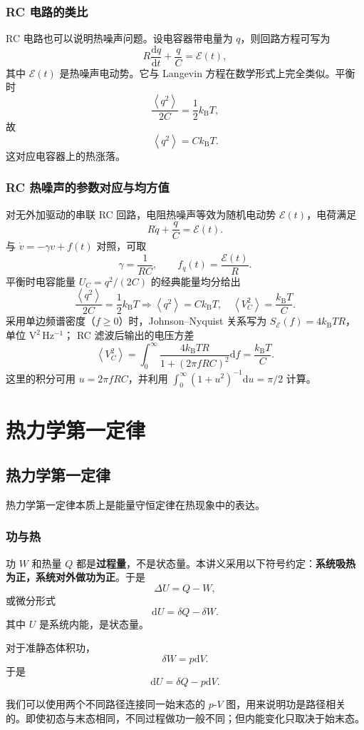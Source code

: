 \documentclass[11pt,a4paper,openany]{ctexbook}
\newcommand{\dd}{\mathrm d}
\newcommand{\kb}{k_{\mathrm B}}
\newcommand{\avg}[1]{\left\langle #1\right\rangle}
\begin{document}
\subsection*{RC 电路的类比}
RC 电路也可以说明热噪声问题。设电容器带电量为 $q$，则回路方程可写为
\[
R\frac{\dd q}{\dd t}+\frac{q}{C}=\mathcal E(t),
\]
其中 $\mathcal E(t)$ 是热噪声电动势。它与 Langevin 方程在数学形式上完全类似。平衡时
\[
\frac{\avg{q^2}}{2C}=\frac12\kb T,
\]
故
\[
\avg{q^2}=C\kb T.
\]
这对应电容器上的热涨落。


\subsection*{RC 热噪声的参数对应与均方值}
对无外加驱动的串联 RC 回路，电阻热噪声等效为随机电动势 $\mathcal E(t)$，电荷满足
\[
R\dot q+\frac qC=\mathcal E(t).
\]
与 $\dot v=-\gamma v+f(t)$ 对照，可取
\[
\gamma=\frac1{RC},\qquad f_q(t)=\frac{\mathcal E(t)}R.
\]
平衡时电容能量 $U_C=q^2/(2C)$ 的经典能量均分给出
\[
\frac{\avg{q^2}}{2C}=\frac12\kb T
\Longrightarrow
\boxed{\avg{q^2}=C\kb T,\quad
\avg{V_C^2}=\frac{\kb T}C}.
\]
采用单边频谱密度（$f\ge0$）时，Johnson--Nyquist 关系写为
$S_{\mathcal E}(f)=4\kb TR$，单位 $\mathrm{V^2\,Hz^{-1}}$；
RC 滤波后输出的电压方差
\[
\avg{V_C^2}=
\int_0^\infty
\frac{4\kb TR}{1+(2\pi fRC)^2}\dd f
=\frac{\kb T}{C}.
\]
这里的积分可用 $u=2\pi fRC$，并利用
$\int_0^\infty (1+u^2)^{-1}\dd u=\pi/2$ 计算。


\chapter{热力学第一定律}

\section{热力学第一定律}
热力学第一定律本质上是能量守恒定律在热现象中的表达。

\subsection*{功与热}
功 $W$ 和热量 $Q$ 都是\textbf{过程量}，不是状态量。本讲义采用以下符号约定：\textbf{系统吸热为正，系统对外做功为正}。于是
\[
\boxed{\Delta U=Q-W},
\]
或微分形式
\[
\boxed{\dd U=\delta Q-\delta W}.
\]
其中 $U$ 是系统内能，是状态量。

对于准静态体积功，
\[
\delta W=p\dd V.
\]
于是
\[
\dd U=\delta Q-p\dd V.
\]

\begin{notebox}
我们可以使用两个不同路径连接同一始末态的 $p$-$V$ 图，用来说明功是路径相关的。即使初态与末态相同，不同过程做功一般不同；但内能变化只取决于始末态。
\end{notebox}
\end{document}
